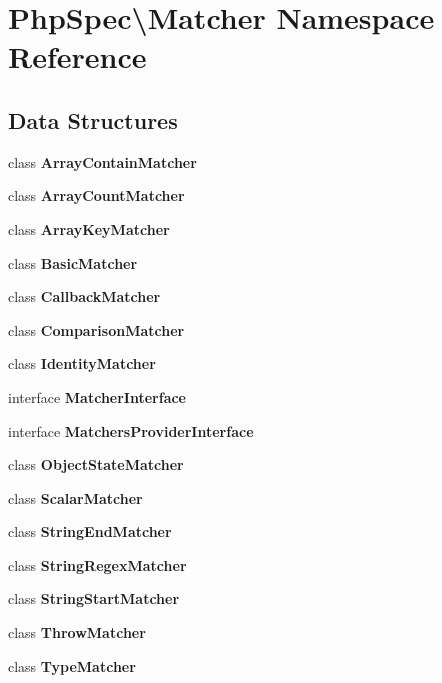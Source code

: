 \section{Php\+Spec\textbackslash{}Matcher Namespace Reference}
\label{namespace_php_spec_1_1_matcher}
\subsection*{Data Structures}
\begin{DoxyCompactItemize}
\item 
class {\bf Array\+Contain\+Matcher}
\item 
class {\bf Array\+Count\+Matcher}
\item 
class {\bf Array\+Key\+Matcher}
\item 
class {\bf Basic\+Matcher}
\item 
class {\bf Callback\+Matcher}
\item 
class {\bf Comparison\+Matcher}
\item 
class {\bf Identity\+Matcher}
\item 
interface {\bf Matcher\+Interface}
\item 
interface {\bf Matchers\+Provider\+Interface}
\item 
class {\bf Object\+State\+Matcher}
\item 
class {\bf Scalar\+Matcher}
\item 
class {\bf String\+End\+Matcher}
\item 
class {\bf String\+Regex\+Matcher}
\item 
class {\bf String\+Start\+Matcher}
\item 
class {\bf Throw\+Matcher}
\item 
class {\bf Type\+Matcher}
\end{DoxyCompactItemize}
